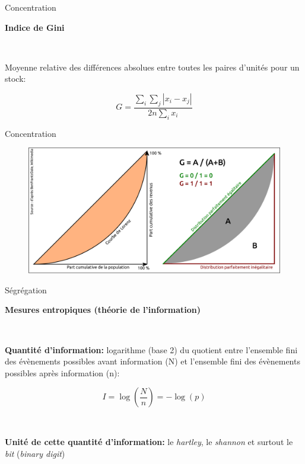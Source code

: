 \begin{frame}{Concentration}

\textbf{Indice de Gini}

~

Moyenne relative des différences absolues entre toutes les paires d'unités pour un stock:

\begin{equation}
\nonumber
G = \frac{\sum_i \sum_j |x_i - x_j|}{2n \sum_i x_i}
\end{equation}

\end{frame}


\begin{frame}{Concentration}

\begin{figure}
\includegraphics[width=12cm]{Lorenz.pdf}
\end{figure}

\end{frame}


\begin{frame}{Ségrégation}

\textbf{Mesures entropiques (théorie de l'information)}

~

\textbf{Quantité d'information:} logarithme (base 2) du quotient entre l'ensemble fini des évènements possibles avant information (N) et l'ensemble fini des évènements possibles après information (n):

\begin{equation}
\nonumber
  I = \log\left(\frac{N}{n} \right) = - \log(p)
\end{equation}

~

\textbf{Unité de cette quantité d'information:} le \textit{hartley}, le \textit{shannon} et surtout le \textit{bit} (\textit{binary digit})

\end{frame}


